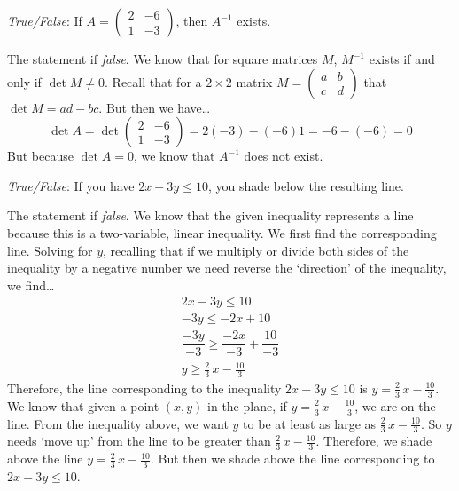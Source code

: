 \documentclass[11pt,letterpaper]{article}
\begin{document}
\quizsol \textit{True/False}: If $A= \begin{pmatrix} 2 & -6 \\ 1 & -3 \end{pmatrix}$, then $A^{-1}$ exists. \pspace

\sol The statement if \textit{false}. We know that for square matrices $M$, $M^{-1}$ exists if and only if $\det M \neq 0$. Recall that for a $2 \times 2$ matrix $M= \begin{pmatrix} a & b \\ c & d \end{pmatrix}$ that $\det M= ad - bc$. But then we have\dots
	\[
	\det A= \det \begin{pmatrix} 2 & -6 \\ 1 & -3 \end{pmatrix}= 2(-3) - (-6)1= -6 - (-6)= 0
	\]
But because $\det A= 0$, we know that $A^{-1}$ does not exist. \pvspace{1.3cm}



\quizsol \textit{True/False}: If you have $2x - 3y \leq 10$, you shade below the resulting line. \pspace

\sol The statement if \textit{false}. We know that the given inequality represents a line because this is a two-variable, linear inequality. We first find the corresponding line. Solving for $y$, recalling that if we multiply or divide both sides of the inequality by a negative number we need reverse the `direction' of the inequality, we find\dots
	\[
	\begin{gathered}
	2x - 3y \leq 10 \\[0.3cm]
	-3y \leq -2x + 10 \\[0.3cm]
	\dfrac{-3y}{-3} \geq \dfrac{-2x}{-3} + \dfrac{10}{-3} \\[0.3cm]
	y \geq \frac{2}{3}\, x - \frac{10}{3}
	\end{gathered}
	\]
Therefore, the line corresponding to the inequality $2x - 3y \leq 10$ is $y= \frac{2}{3}\,x - \frac{10}{3}$. We know that given a point $(x, y)$ in the plane, if $y= \frac{2}{3}\,x - \frac{10}{3}$, we are on the line. From the inequality above, we want $y$ to be at least as large as $\frac{2}{3}\,x - \frac{10}{3}$. So $y$ needs `move up' from the line to be greater than $\frac{2}{3}\, x - \frac{10}{3}$. Therefore, we shade above the line $y= \frac{2}{3}\,x - \frac{10}{3}$. But then we shade above the line corresponding to $2x - 3y \leq 10$. \pvspace{0.8cm} 
\end{document}
